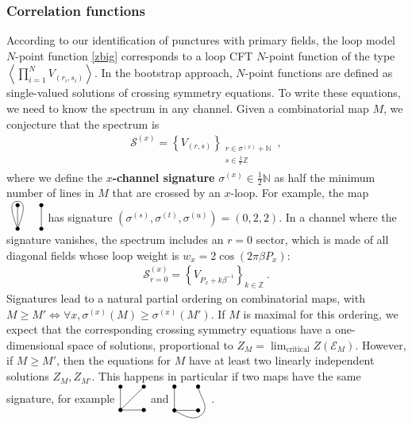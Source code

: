 \documentclass[12pt, a4paper]{article}
\newcommand{\vertices}{
\coordinate (base) at (0, 1);
\draw (0, 0) node[fill, circle, minimum size = 1.3mm, inner sep = 0]{};
  \draw (3, 0) node[fill, circle, minimum size = 1.3mm, inner sep = 0]{};
  \draw (0, 3) node[fill, circle, minimum size = 1.3mm, inner sep = 0]{};
  \draw (3, 3) node[fill, circle, minimum size = 1.3mm, inner sep = 0]{};
}
\theoremstyle{break}
\begin{document}
\subsubsection{Correlation functions}

According to our identification of punctures with primary fields, the loop model $N$-point function \eqref{zbig} corresponds to a loop CFT $N$-point function of the type $\left<\prod_{i=1}^N V_{(r_i,s_i)}\right>$. In the bootstrap approach, $N$-point functions are defined as single-valued solutions of crossing symmetry equations. To write these equations, we need to know the spectrum in any channel. Given a combinatorial map $M$, we conjecture that the spectrum is 
\begin{align}
 \mathcal{S}^{(x)} = \left\{V_{(r,s)}\right\}_{\substack{r\in \sigma^{(x)}+\mathbb{N} \\ s\in\frac{1}{r}\mathbb{Z}}}\ ,
 \label{sxs}
\end{align}
where we define the \textbf{$x$-channel signature} $\sigma^{(x)}\in\frac12\mathbb{N}$ as half the minimum number of lines in $M$ that are crossed by an $x$-loop. For example, the map 
$
\begin{tikzpicture}[baseline=(base), scale = .25]
 \vertices
  \draw (0, 0) -- (0, 3);
  \draw (3, 0) -- (3, 3);
  \draw (0, 0) to [out = 70, in = 0] (0, 3.5) to [out = 180, in = 110] (0, 0);
 \end{tikzpicture}
 $
has signature $(\sigma^{(s)},\sigma^{(t)},\sigma^{(u)})=(0,2,2)$. In a channel where the signature vanishes, the spectrum includes an $r=0$ sector, which is made of all diagonal fields whose loop weight is $w_x=2\cos(2\pi\beta P_x)$:
\begin{align}
 \mathcal{S}^{(x)}_{r=0} = \left\{V_{P_x+k\beta^{-1}}\right\}_{k\in\mathbb{Z}}\ . 
 \label{srz}
\end{align}
Signatures lead to a natural partial ordering on combinatorial maps, with $M\geq M' \iff \forall x, \sigma^{(x)}(M)\geq \sigma^{(x)}(M')$. If $M$ is maximal for this ordering, we expect that the corresponding crossing symmetry equations have a one-dimensional space of solutions, proportional to $Z_M = \lim_\text{critical} Z(\mathcal{E}_M)$. However, if $M\geq M'$, then the equations for $M$ have at least two linearly independent solutions $Z_M,Z_{M'}$. This happens in particular if two maps have the same signature, for example 
$
\begin{tikzpicture}[baseline=(base), scale = .25]
 \vertices
  \draw (0, 0) -- (0, 3);
  \draw (0, 0) -- (3, 3);
  \draw (0, 0) -- (3, 0);
 \end{tikzpicture}
$ and $
 \begin{tikzpicture}[baseline=(base), scale = .25]
 \vertices
  \draw (0, 0) -- (3, 0);
  \draw (0, 0) -- (0, 3);
  \draw (0, 0) to [out = -30, in = -135] (3.5, -.5) to [out = 45, in = -80] (3, 3);
  \end{tikzpicture}
$. 
\end{document}
